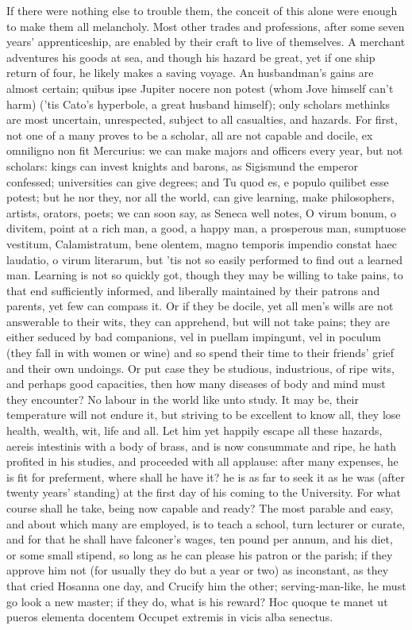{If there were nothing else to trouble them, the conceit of this alone
were enough to make them all melancholy. Most other trades and
professions, after some seven years' apprenticeship, are enabled by
their craft to live of themselves. A merchant adventures his goods at
sea, and though his hazard be great, yet if one ship return of four, he
likely makes a saving voyage. An husbandman's gains are almost certain;
quibus ipse Jupiter nocere non potest (whom Jove himself can't harm)
('tis Cato's hyperbole, a great husband himself); only scholars
methinks are most uncertain, unrespected, subject to all casualties,
and hazards. For first, not one of a many proves to be a scholar, all
are not capable and docile, ex omniligno non fit Mercurius: we
can make majors and officers every year, but not scholars: kings can
invest knights and barons, as Sigismund the emperor confessed;
universities can give degrees; and Tu quod es, e populo quilibet esse
potest; but he nor they, nor all the world, can give learning, make
philosophers, artists, orators, poets; we can soon say, as Seneca well
notes, O virum bonum, o divitem, point at a rich man, a good, a happy
man, a prosperous man, sumptuose vestitum, Calamistratum, bene olentem,
magno temporis impendio constat haec laudatio, o virum literarum, but
'tis not so easily performed to find out a learned man. Learning is not
so quickly got, though they may be willing to take pains, to that end
sufficiently informed, and liberally maintained by their patrons and
parents, yet few can compass it. Or if they be docile, yet all men's
wills are not answerable to their wits, they can apprehend, but will
not take pains; they are either seduced by bad companions, vel in
puellam impingunt, vel in poculum (they fall in with women or wine) and
so spend their time to their friends' grief and their own undoings. Or
put case they be studious, industrious, of ripe wits, and perhaps good
capacities, then how many diseases of body and mind must they
encounter? No labour in the world like unto study. It may be, their
temperature will not endure it, but striving to be excellent to know
all, they lose health, wealth, wit, life and all. Let him yet happily
escape all these hazards, aereis intestinis with a body of brass, and
is now consummate and ripe, he hath profited in his studies, and
proceeded with all applause: after many expenses, he is fit for
preferment, where shall he have it? he is as far to seek it as he was
(after twenty years' standing) at the first day of his coming to the
University. For what course shall he take, being now capable and ready?
The most parable and easy, and about which many are employed, is to
teach a school, turn lecturer or curate, and for that he shall have
falconer's wages, ten pound per annum, and his diet, or some small
stipend, so long as he can please his patron or the parish; if they
approve him not (for usually they do but a year or two) as inconstant,
as they that cried Hosanna one day, and Crucify him the other;
serving-man-like, he must go look a new master; if they do, what is his
reward?
Hoc quoque te manet ut pueros elementa docentem
Occupet extremis in vicis alba senectus.

}
